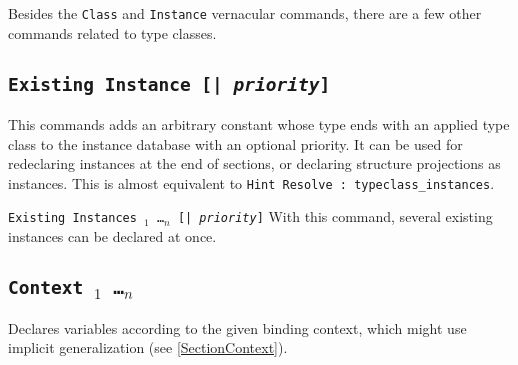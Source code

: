 Besides the {\tt Class} and {\tt Instance} vernacular commands, there
are a few other commands related to type classes.

\subsection{\tt Existing Instance {\ident} [| \textit{priority}]}
\label{ExistingInstance}

This commands adds an arbitrary constant whose type ends with an applied
type class to the instance database with an optional priority. It can be used
for redeclaring instances at the end of sections, or declaring structure
projections as instances. This is almost equivalent to {\tt Hint Resolve
{\ident} : typeclass\_instances}.

\begin{Variants}
\item {\tt Existing Instances {\ident}$_1$ \ldots {\ident}$_n$
  [| \textit{priority}]}
  With this command, several existing instances can be declared at once.
\end{Variants}

\subsection{\tt Context {\binder$_1$ \ldots \binder$_n$}}
\label{Context}

Declares variables according to the given binding context, which might
use implicit generalization (see \ref{SectionContext}).


